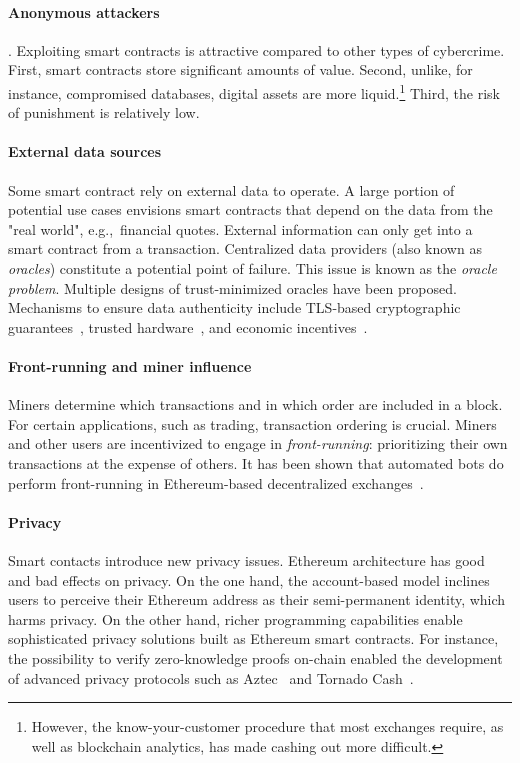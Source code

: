 \paragraph{Anonymous attackers}.
Exploiting smart contracts is attractive compared to other types of cybercrime.
First, smart contracts store significant amounts of value.
Second, unlike, for instance, compromised databases, digital assets are more liquid.\footnote{However, the know-your-customer procedure that most exchanges require, as well as blockchain analytics, has made cashing out more difficult.}
Third, the risk of punishment is relatively low.

\paragraph{External data sources}
Some smart contract rely on external data to operate.
A large portion of potential use cases envisions smart contracts that depend on the data from the "real world", e.g.,~financial quotes.
External information can only get into a smart contract from a transaction.
Centralized data providers (also known as \textit{oracles}) constitute a potential point of failure.
This issue is known as the \textit{oracle problem}.
Multiple designs of trust-minimized oracles have been proposed.
Mechanisms to ensure data authenticity include TLS-based cryptographic guarantees~\cite{Provable}, trusted hardware~\cite{Zhang2016}, and economic incentives~\cite{Chainlink}.

\paragraph{Front-running and miner influence}
Miners determine which transactions and in which order are included in a block.
For certain applications, such as trading, transaction ordering is crucial.
Miners and other users are incentivized to engage in \textit{front-running}: prioritizing their own transactions at the expense of others.
It has been shown that automated bots do perform front-running in Ethereum-based decentralized exchanges~\cite{Daian2019}.

\paragraph{Privacy}
Smart contacts introduce new privacy issues.
Ethereum architecture has good and bad effects on privacy.
On the one hand, the account-based model inclines users to perceive their Ethereum address as their semi-permanent identity, which harms privacy.
On the other hand, richer programming capabilities enable sophisticated privacy solutions built as Ethereum smart contracts.
For instance, the possibility to verify zero-knowledge proofs on-chain enabled the development of advanced privacy protocols such as Aztec~\cite{Aztec} and Tornado Cash~\cite{TornadoCash}.

